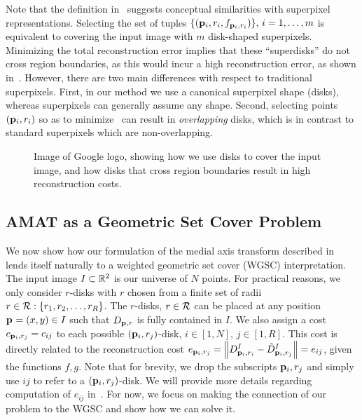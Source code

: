 \documentclass[10pt,twocolumn,letterpaper]{article}
\begin{document}
Note that the definition in~ suggests conceptual similarities with superpixel representations.
Selecting the set of tuples $\{(\mathbf{p}_{i},r_i,f_{\mathbf{p}_{i},r_i})\},\,i=1,\ldots,m$ is equivalent to covering the input image
with $m$ disk-shaped superpixels. Minimizing the total reconstruction error implies that these ``superdisks'' do not
cross region boundaries, as this would incur a high reconstruction error, as shown in~.
However, there are two main differences with respect to traditional superpixels.
First, in our method we use a canonical
superpixel shape (disks), whereas superpixels can generally assume any shape. Second, selecting points $(\mathbf{p}_{i},r_i)$
so as to minimize~ can result in \emph{overlapping} disks, which is in contrast to standard superpixels
which are non-overlapping. 

\begin{figure}[ht]
\caption{Image of Google logo, showing how we use disks to cover the input image, and how disks that cross region boundaries result
in high reconstruction costs.}
\label{fig:google}
\end{figure}


\subsection{AMAT as a Geometric Set Cover Problem}\label{sec:amat-wgsc}
We now show how our formulation of the medial axis transform described in~ lends itself naturally to a 
weighted geometric set cover (WGSC) interpretation.
The input image $I\subset\mathbb{R}^2$ is our universe of $N$ points.
For practical reasons, we only consider $r$-disks with $r$ chosen from a finite set of radii $r\in\mathcal{R}:\{r_1,r_2,\ldots,r_R\}$.
The $r$-disks, $r\in\mathcal{R}$ can be placed at any position $\mathbf{p}_{}=(x,y)\in I$ such that $D_{\mathbf{p}_{},r}$ is fully contained in $I$.
We also assign a cost $c_{\mathbf{p}_{i},r_j} = c_{ij}$ to each possible $(\mathbf{p}_{i},r_j)$-disk, $i\in[1,N],\, j\in[1,R]$.
This cost is directly related to the reconstruction cost 
$e_{\mathbf{p}_{i},r_j}=\left \lVert D_{\mathbf{p}_{i},r_i}^I - \tilde{D}_{\mathbf{p}_{i},r_j}^I \right \rVert = e_{ij}$, given the functions $f,g$.
Note that for brevity, we drop the subscripts $\mathbf{p}_{i},r_j$ and simply use $ij$ to refer to a $(\mathbf{p}_{i},r_j)$-disk.
We will provide more details regarding computation of $e_{ij}$ in~.
For now, we focus on making the connection of our problem to the WGSC and show how we can solve it.
\end{document}
